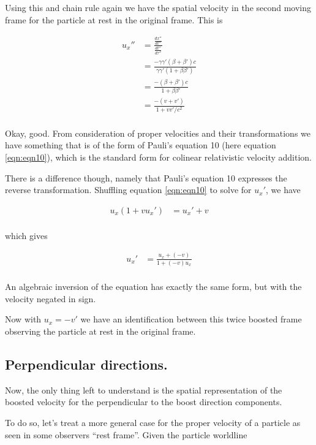 Using this and chain rule again we have the spatial velocity in the second moving frame for the particle at rest in the original frame.  This is

\begin{align*}
u_x'' 
&=
\frac{\frac{dx''}{dt''}}{ \frac{dt''}{d\tau''} } \\
&=
\frac{-\gamma \gamma' (\beta + \beta') c}{ \gamma \gamma'( 1 + \beta\beta' ) } \\
&=
\frac{-(\beta + \beta') c}{ 1 + \beta\beta' } \\
&=
\frac{-(v + v') }{ 1 + v v'/c^2 } \\
\end{align*}

Okay, good.  From consideration of proper velocities and their transformations we have something that is of
the form of Pauli's equation 10 (here equation \ref{eqn:eqn10}), which is the standard form for colinear 
relativistic velocity addition.

There is a difference though, namely that Pauli's equation 10 expresses the reverse transformation.  Shuffling
equation \ref{eqn:eqn10} to solve for $u_x'$, we have

\begin{align*}
u_x ( 1 + v {u_x}') &= { {u_x}' + v  } \\
\end{align*}

which gives

\begin{align*}
u_x' &= \frac{ {u_x} + (-v)  }{ 1 + (-v) {u_x}} \\
\end{align*}

An algebraic inversion of the equation has exactly the same form, but with the velocity negated in sign.

Now with $u_x = -v'$ we have an identification between this twice boosted frame observing the particle at
rest in the original frame.

\subsection{Perpendicular directions. }

Now, the only thing left to understand is the spatial representation of the boosted velocity 
for the perpendicular to the boost direction components.

To do so, let's treat a more general case for the proper velocity of a particle as seen in some observers ``rest frame''.  Given the particle worldline

